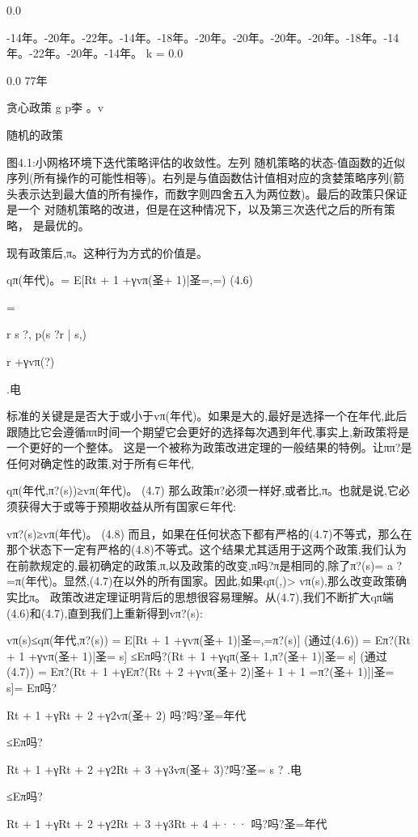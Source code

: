 0.0

-14年。-20年。-22年。-14年。-18年。-20年。-20年。-20年。-20年。-18年。-14年。-22年。-20年。-14年。
k =
0.0

0.0
77年

贪心政策
g p李
   。v

随机的政策

图4.1:小网格环境下迭代策略评估的收敛性。左列
随机策略的状态-值函数的近似序列(所有操作的可能性相等)。右列是与值函数估计值相对应的贪婪策略序列(箭头表示达到最大值的所有操作，而数字则四舍五入为两位数)。最后的政策只保证是一个
对随机策略的改进，但是在这种情况下，以及第三次迭代之后的所有策略，
是最优的。


现有政策后,π。这种行为方式的价值是。

qπ(年代)。= E[Rt + 1 +γvπ(圣+ 1)|圣=,=) 					(4.6)

=

r s ?,
p(s ?r | s,)

r +γvπ(?)

.电

标准的关键是是否大于或小于vπ(年代)。如果是大的,最好是选择一个在年代,此后跟随比它会遵循ππ时间一个期望它会更好的选择每次遇到年代,事实上,新政策将是一个更好的一个整体。
这是一个被称为政策改进定理的一般结果的特例。让ππ?是任何对确定性的政策,对于所有∈年代,

qπ(年代,π?(s))≥vπ(年代)。 					(4.7)
那么政策π?必须一样好,或者比,π。也就是说,它必须获得大于或等于预期收益从所有国家∈年代:

vπ?(s)≥vπ(年代)。 					(4.8)
而且，如果在任何状态下都有严格的(4.7)不等式，那么在那个状态下一定有严格的(4.8)不等式。这个结果尤其适用于这两个政策,我们认为在前款规定的,最初确定的政策,π,以及政策的改变,π吗?π是相同的,除了π?(s)= a ? =π(年代)。显然,(4.7)在以外的所有国家。因此,如果qπ(,)> vπ(s),那么改变政策确实比π。
政策改进定理证明背后的思想很容易理解。从(4.7),我们不断扩大qπ端(4.6)和(4.7),直到我们上重新得到vπ?(s):

vπ(s)≤qπ(年代,π?(s))
= E[Rt + 1 +γvπ(圣+ 1)|圣=,=π?(s)] 					(通过(4.6))
= Eπ?(Rt + 1 +γvπ(圣+ 1)|圣= s]
≤Eπ吗?(Rt + 1 +γqπ(圣+ 1,π?(圣+ 1)|圣= s] 					(通过(4.7))
= Eπ?(Rt + 1 +γEπ?(Rt + 2 +γvπ(圣+ 2)|圣+ 1 + 1 =π?(圣+ 1)]|圣= s]= Eπ吗?

Rt + 1 +γRt + 2 +γ2vπ(圣+ 2)
吗?吗?圣=年代

≤Eπ吗?

Rt + 1 +γRt + 2 +γ2Rt + 3 +γ3vπ(圣+ 3)?吗?圣= s ?
.电

≤Eπ吗?

Rt + 1 +γRt + 2 +γ2Rt + 3 +γ3Rt + 4 +···
吗?吗?圣=年代

